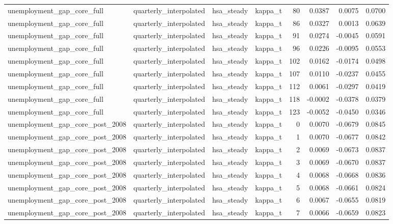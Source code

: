 \begin{tabular}{llllrrrr}
unemployment\_gap\_core\_full & quarterly\_interpolated & hsa\_steady & kappa\_t & 80 & 0.0387 & 0.0075 & 0.0700 \\
unemployment\_gap\_core\_full & quarterly\_interpolated & hsa\_steady & kappa\_t & 86 & 0.0327 & 0.0013 & 0.0639 \\
unemployment\_gap\_core\_full & quarterly\_interpolated & hsa\_steady & kappa\_t & 91 & 0.0274 & -0.0045 & 0.0591 \\
unemployment\_gap\_core\_full & quarterly\_interpolated & hsa\_steady & kappa\_t & 96 & 0.0226 & -0.0095 & 0.0553 \\
unemployment\_gap\_core\_full & quarterly\_interpolated & hsa\_steady & kappa\_t & 102 & 0.0162 & -0.0174 & 0.0498 \\
unemployment\_gap\_core\_full & quarterly\_interpolated & hsa\_steady & kappa\_t & 107 & 0.0110 & -0.0237 & 0.0455 \\
unemployment\_gap\_core\_full & quarterly\_interpolated & hsa\_steady & kappa\_t & 112 & 0.0061 & -0.0297 & 0.0419 \\
unemployment\_gap\_core\_full & quarterly\_interpolated & hsa\_steady & kappa\_t & 118 & -0.0002 & -0.0378 & 0.0379 \\
unemployment\_gap\_core\_full & quarterly\_interpolated & hsa\_steady & kappa\_t & 123 & -0.0052 & -0.0450 & 0.0346 \\
unemployment\_gap\_core\_post\_2008 & quarterly\_interpolated & hsa\_steady & kappa\_t & 0 & 0.0070 & -0.0679 & 0.0845 \\
unemployment\_gap\_core\_post\_2008 & quarterly\_interpolated & hsa\_steady & kappa\_t & 1 & 0.0070 & -0.0677 & 0.0842 \\
unemployment\_gap\_core\_post\_2008 & quarterly\_interpolated & hsa\_steady & kappa\_t & 2 & 0.0069 & -0.0673 & 0.0837 \\
unemployment\_gap\_core\_post\_2008 & quarterly\_interpolated & hsa\_steady & kappa\_t & 3 & 0.0069 & -0.0670 & 0.0837 \\
unemployment\_gap\_core\_post\_2008 & quarterly\_interpolated & hsa\_steady & kappa\_t & 4 & 0.0068 & -0.0668 & 0.0836 \\
unemployment\_gap\_core\_post\_2008 & quarterly\_interpolated & hsa\_steady & kappa\_t & 5 & 0.0068 & -0.0661 & 0.0824 \\
unemployment\_gap\_core\_post\_2008 & quarterly\_interpolated & hsa\_steady & kappa\_t & 6 & 0.0067 & -0.0655 & 0.0819 \\
unemployment\_gap\_core\_post\_2008 & quarterly\_interpolated & hsa\_steady & kappa\_t & 7 & 0.0066 & -0.0659 & 0.0823 \\

\end{tabular}
